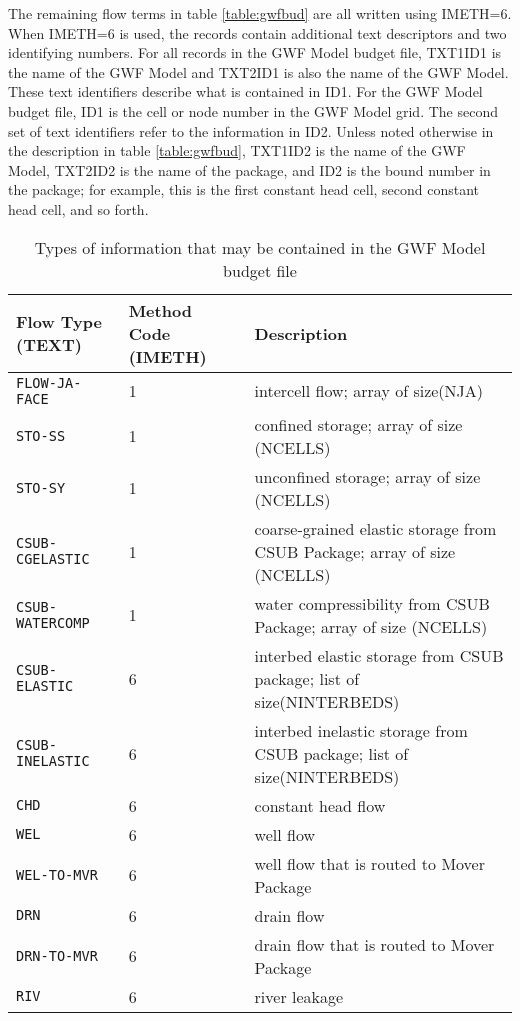 The remaining flow terms in table \ref{table:gwfbud} are all written using IMETH=6.  When IMETH=6 is used, the records contain additional text descriptors and two identifying numbers.  For all records in the GWF Model budget file, TXT1ID1 is the name of the GWF Model and TXT2ID1 is also the name of the GWF Model.  These text identifiers describe what is contained in ID1.  For the GWF Model budget file, ID1 is the cell or node number in the GWF Model grid.  The second set of text identifiers refer to the information in ID2.  Unless noted otherwise in the description in table \ref{table:gwfbud}, TXT1ID2 is the name of the GWF Model, TXT2ID2 is the name of the package, and ID2 is the bound number in the package; for example, this is the first constant head cell, second constant head cell, and so forth.  

\begin{longtable}{p{3.5cm} p{2cm} p{9cm}}
\caption{Types of information that may be contained in the GWF Model budget file} 
\tabularnewline
\hline
\textbf{Flow Type (TEXT)} & \textbf{Method Code (IMETH)} & \textbf{Description} \\
\hline
\endhead
\hline
\endfoot
\texttt{FLOW-JA-FACE} & 1 & intercell flow; array of size(NJA) \\
\texttt{STO-SS} & 1 & confined storage; array of size (NCELLS) \\
\texttt{STO-SY} & 1 & unconfined storage; array of size (NCELLS) \\
\texttt{CSUB-CGELASTIC} & 1 & coarse-grained elastic storage from CSUB Package; array of size (NCELLS) \\
\texttt{CSUB-WATERCOMP} & 1 & water compressibility from CSUB Package; array of size (NCELLS) \\
\texttt{CSUB-ELASTIC} & 6 & interbed elastic storage from CSUB package; list of size(NINTERBEDS) \\
\texttt{CSUB-INELASTIC} & 6 & interbed inelastic storage from CSUB package; list of size(NINTERBEDS) \\
\texttt{CHD} & 6 & constant head flow\\
\texttt{WEL} & 6 & well flow \\
\texttt{WEL-TO-MVR} & 6 & well flow that is routed to Mover Package \\
\texttt{DRN} & 6 & drain flow \\
\texttt{DRN-TO-MVR} & 6 & drain flow that is routed to Mover Package\\
\texttt{RIV} & 6 & river leakage \\

\end{longtable}
